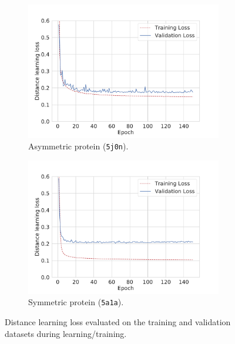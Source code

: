 \begin{figure}
    \centering
    \begin{subfigure}[t]{0.45\textwidth}
        \includegraphics[height=6cm]{figures/de_5j0n}
        \caption{Asymmetric protein (\texttt{5j0n}).}
        \label{fig:losses-siamese-assym}
    \end{subfigure} \quad \quad
    \begin{subfigure}[t]{0.5\textwidth}
        \includegraphics[height=6cm]{figures/de_5a1a}
        \caption{Symmetric protein (\texttt{5a1a}).}
        \label{fig:losses-siamese-sym}
    \end{subfigure}
    \caption{
        Distance learning loss  evaluated on the training and validation datasets during learning/training.
    }\label{fig:losses-siamese}
\end{figure}

